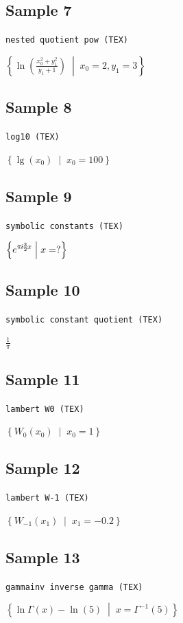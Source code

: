 \documentclass{article}
\begin{document}
\subsection*{Sample 7}
\noindent\texttt{nested quotient pow (TEX)}
\begin{flushleft}
$\displaystyle \left\{ \ln(\frac{x_{0}^{2} + y_{1}^{2}}{y_{1} + 1}) \;\middle|\; x_{0} = 2, y_{1} = 3 \right\}$
\end{flushleft}

\subsection*{Sample 8}
\noindent\texttt{log10 (TEX)}
\begin{flushleft}
$\displaystyle \left\{ \lg(x_{0}) \;\middle|\; x_{0} = 100 \right\}$
\end{flushleft}

\subsection*{Sample 9}
\noindent\texttt{symbolic constants (TEX)}
\begin{flushleft}
$\displaystyle \left\{ e^{\pi\mkern-2mu i\mkern-2mu \frac{3}{2}\mkern-2mu x} \;\middle|\; x = ? \right\}$
\end{flushleft}

\subsection*{Sample 10}
\noindent\texttt{symbolic constant quotient (TEX)}
\begin{flushleft}
$\displaystyle \frac{1}{\pi}$
\end{flushleft}

\subsection*{Sample 11}
\noindent\texttt{lambert W0 (TEX)}
\begin{flushleft}
$\displaystyle \left\{ W_{0}(x_{0}) \;\middle|\; x_{0} = 1 \right\}$
\end{flushleft}

\subsection*{Sample 12}
\noindent\texttt{lambert W-1 (TEX)}
\begin{flushleft}
$\displaystyle \left\{ W_{-1}(x_{1}) \;\middle|\; x_{1} = -0.2 \right\}$
\end{flushleft}

\subsection*{Sample 13}
\noindent\texttt{gammainv inverse gamma (TEX)}
\begin{flushleft}
$\displaystyle \left\{ \ln\Gamma(x) - \ln(5) \;\middle|\; x = \Gamma^{-1}(5) \right\}$
\end{flushleft}
\end{document}
